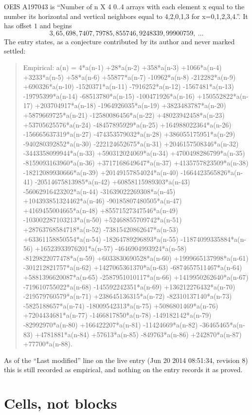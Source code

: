 \documentclass[11pt,a4paper]{article}
\theoremstyle{plain}
\theoremstyle{definition}
\begin{document}
OEIS A197043 is ``Number of n X 4 0..4 arrays with each element x equal to the number its horizontal and vertical neighbors equal to 4,2,0,1,3 for x=0,1,2,3,4.''. It has offset $1$ and begins
\[
3, 65, 698, 7407, 79785, 855746, 9248339, 99900759,\ \dots
\]
The entry states, as a conjecture contributed by its author and never marked settled:
\begin{quote}
Empirical: a(n) = 4*a(n-1) +28*a(n-2) +358*a(n-3) +1066*a(n-4) +3233*a(n-5) +58*a(n-6) +55877*a(n-7) -10962*a(n-8) -212282*a(n-9) +690326*a(n-10) -1520371*a(n-11) -7916252*a(n-12) -1567481*a(n-13) -19795399*a(n-14) -68513780*a(n-15) -100471926*a(n-16) +150552822*a(n-17) +203704917*a(n-18) -1964926035*a(n-19) +3823483787*a(n-20) +5879669725*a(n-21) -12580086456*a(n-22) +48023942458*a(n-23) +53705625576*a(n-24) -48457895929*a(n-25) +164988022364*a(n-26) -156665637319*a(n-27) -474353579032*a(n-28) +386055175951*a(n-29) -940280392852*a(n-30) -222124652675*a(n-31) +2046157508346*a(n-32) -3443358099944*a(n-33) +590312024069*a(n-34) +4700498286799*a(n-35) -8159093163960*a(n-36) +3717168649647*a(n-37) +4135757823509*a(n-38) -18212089930666*a(n-39) +20149157854024*a(n-40) -1664423565826*a(n-41) -20514675813985*a(n-42) +60858115989303*a(n-43) -56062916423202*a(n-44) -31639022269308*a(n-45) +104393851324462*a(n-46) -90185807480505*a(n-47) +4169455004665*a(n-48) +85571527347546*a(n-49) -103002287103213*a(n-50) +52468855709742*a(n-51) +28763768584718*a(n-52) -73815420862647*a(n-53) +63361158850554*a(n-54) -18264789296893*a(n-55) -11874099335884*a(n-56) +16523933976201*a(n-57) -4646904993924*a(n-58) -8129822077478*a(n-59) +6033830690528*a(n-60) +1999665137998*a(n-61) -301212821757*a(n-62) +1427065361370*a(n-63) -6874657511467*a(n-64) +5881396620087*a(n-65) -2587951010117*a(n-66) +1419950262640*a(n-67) -719610755022*a(n-68) -145592242351*a(n-69) +136212276432*a(n-70) -219579760579*a(n-71) +238645136315*a(n-72) -82310137140*a(n-73) -5825188657*a(n-74) -18009542313*a(n-75) +5086801469*a(n-76) +7204434681*a(n-77) -1466817850*a(n-78) -149182142*a(n-79) -82992970*a(n-80) +166422207*a(n-81) -11424669*a(n-82) -36465465*a(n-83) +4781881*a(n-84) +57613*a(n-85) -849763*a(n-86) +242870*a(n-87) +77700*a(n-88).
\end{quote}
As of the ``Last modified'' line on the live entry (Jun 20 2014 08:51:34, revision 8) this is still
recorded as empirical, and nothing on the entry records it as proved.

\section{Cells, not blocks}
\end{document}
